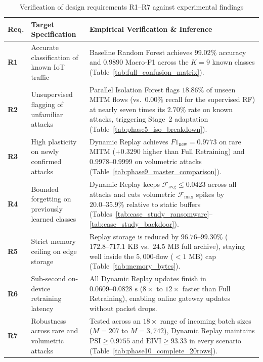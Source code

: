 \begin{table}[htbp]
\centering
\small
\renewcommand{\arraystretch}{1.25}
\caption{Verification of design requirements R1--R7 against experimental findings}
\label{tab:requirements_verification}
\begin{tabular}{|l|p{3.8cm}|p{7.6cm}|}
\hline
\textbf{Req.} & \textbf{Target Specification} & \textbf{Empirical Verification \& Inference} \\ \hline
\textbf{R1} & Accurate classification of known IoT traffic & Baseline Random Forest achieves $99.02\%$ accuracy and $0.9890$ Macro-F1 across the $K = 9$ known classes (Table~\ref{tab:full_confusion_matrix}). \\ \hline
\textbf{R2} & Unsupervised flagging of unfamiliar attacks & Parallel Isolation Forest flags $18.86\%$ of unseen MITM flows (vs.\ $0.00\%$ recall for the supervised RF) at nearly seven times its $2.70\%$ rate on known attacks, triggering Stage~2 adaptation (Table~\ref{tab:phase5_iso_breakdown}). \\ \hline
\textbf{R3} & High plasticity on newly confirmed attacks & Dynamic Replay achieves $F1_{\text{new}} = 0.9773$ on rare MITM ($+0.3290$ higher than Full Retraining) and $0.9978\text{--}0.9999$ on volumetric attacks (Table~\ref{tab:phase9_master_comparison}). \\ \hline
\textbf{R4} & Bounded forgetting on previously learned classes & Dynamic Replay keeps $\mathcal{F}_{\text{avg}} \le 0.0423$ across all attacks and cuts volumetric $\mathcal{F}_{\max}$ spikes by $20.0\text{--}35.9\%$ relative to static buffers (Tables~\ref{tab:case_study_ransomware}--\ref{tab:case_study_backdoor}). \\ \hline
\textbf{R5} & Strict memory ceiling on edge storage & Replay storage is reduced by $96.76\text{--}99.30\%$ ($172.8\text{--}717.1\text{ KB}$ vs.\ $24.5\text{ MB}$ full archive), staying well inside the $5{,}000$-flow ($<1\text{ MB}$) cap (Table~\ref{tab:memory_bytes}). \\ \hline
\textbf{R6} & Sub-second on-device retraining latency & All Dynamic Replay updates finish in $0.0609\text{--}0.0828\text{ s}$ ($8\times$ to $12\times$ faster than Full Retraining), enabling online gateway updates without packet drops. \\ \hline
\textbf{R7} & Robustness across rare and volumetric attacks & Tested across an $18\times$ range of incoming batch sizes ($M = 207$ to $M = 3{,}742$), Dynamic Replay maintains $\text{PSI} \ge 0.9755$ and $\text{EIVI} \ge 93.33$ in every scenario (Table~\ref{tab:phase10_complete_20rows}). \\ \hline
\end{tabular}
\end{table}

